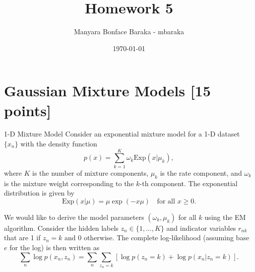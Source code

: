 \documentclass{article}
\begin{document}
\title{Homework 5}
\author{Manyara Bonface Baraka - mbaraka}
\date{\today}
\maketitle

\section{Gaussian Mixture Models [15 points]}

1-D Mixture Model Consider an exponential mixture model for a 1-D dataset $\{x_n\}$ with the density function
\[
p(x) = \sum_{k=1}^K \omega_k \text{Exp}(x|\mu_k),
\]
where $K$ is the number of mixture components, $\mu_k$ is the rate component, and $\omega_k$ is the mixture weight corresponding to the $k$-th component. The exponential distribution is given by
\[
\text{Exp}(x|\mu) = \mu \exp(-x\mu) \quad \text{for all } x \geq 0. \tag{1}
\]

We would like to derive the model parameters $(\omega_k, \mu_k)$ for all $k$ using the EM algorithm. Consider the hidden labels $z_n \in \{1, \ldots, K\}$ and indicator variables $r_{nk}$ that are 1 if $z_n = k$ and 0 otherwise. The complete log-likelihood (assuming base $e$ for the log) is then written as
\[
\sum_n \log p(x_n, z_n) = \sum_n \sum_{z_n=k} \left[\log p(z_n = k) + \log p(x_n|z_n = k)\right].
\]
\end{document}
